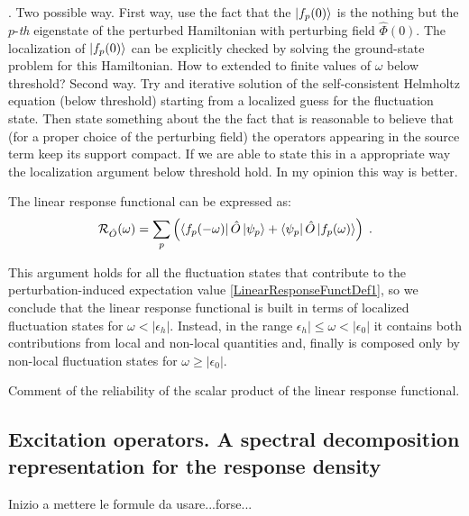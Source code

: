 \documentclass[reprint,aps,prb]{revtex4-1}
\newcommand{\eps}{\epsilon}
\newcommand{\be}{\begin{equation}}
\newcommand{\ee}{\end{equation}}
\newcommand{\lb}{\label}
\newcommand{\op}[1]{\hat {#1}}
\begin{document}
\vspace{0.3cm}
. Two possible way. First way, use the fact that the $\ket{f_p(0)}$ is the nothing but the $p$-\emph{th} 
eigenstate of the perturbed Hamiltonian with perturbing field $\op\Phi(0)$. The localization of $\ket{f_p(0)}$ can be explicitly checked by solving the ground-state problem for
this Hamiltonian. How to extended to finite values of $\omega$ below threshold? Second way. Try and iterative solution of the self-consistent Helmholtz equation (below threshold) 
starting from a localized guess for the fluctuation state. Then state something about the the fact that is reasonable to believe that (for a proper choice of the perturbing field)
the operators appearing in the source term keep its support compact. If we are able to state this in a appropriate way the localization argument below threshold hold. In my opinion
this way is better.
\vspace{0.3cm}

The linear response functional can be expressed as:
\be\lb{LinearResponseFunctDef2}
{\cal R}_{\op O}(\omega) = 
\sum_p\left(\bra{f_p(-\omega)}\op O\ket{\psi_p} + \bra{\psi_p}\op O\ket{f_p(\omega)}\right) \;.
\ee

This argument holds for all the fluctuation states that contribute to the perturbation-induced expectation value \eqref{LinearResponseFunctDef1}, so we conclude that
the linear response functional is built in terms of localized fluctuation states for $\omega < |\eps_h|$. Instead, in the range $\eps_h|\leq\omega<|\eps_0|$ it contains both
contributions from local and non-local quantities and, finally is composed only by non-local fluctuation states for $\omega\geq|\eps_0|$. 

Comment of the reliability of the scalar product of the linear response functional.

\vspace{0.3cm}



\subsection{Excitation operators. A spectral decomposition representation for the response density}

Inizio a mettere le formule da usare...forse...
\end{document}
